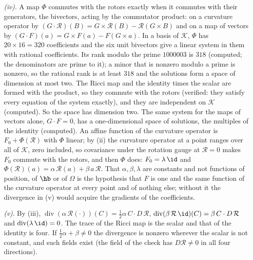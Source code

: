 \emph{(iv).} A map $\Phi$ commutes with the rotors exactly when it commutes with their generators, the bivectors, acting by the commutator product: on a curvature operator by $(G \cdot \mathcal{R})(B) = G \times \mathcal{R}(B) - \mathcal{R}(G \times B)$ and on a map of vectors by $(G \cdot F)(a) = G \times F(a) - F(G \times a)$. In a basis of $\mathcal{K}$, $\Phi$ has $20 \times 16 = 320$ coefficients and the six unit bivectors give a linear system in them with rational coefficients. Its rank modulo the prime $1000003$ is $318$ (computed; the denominators are prime to it); a minor that is nonzero modulo a prime is nonzero, so the rational rank is at least $318$ and the solutions form a space of dimension at most two. The Ricci map and the identity times the scalar are formed with the product, so they commute with the rotors (verified: they satisfy every equation of the system exactly), and they are independent on $\mathcal{K}$ (computed). So the space has dimension two. The same system for the maps of vectors alone, $G \cdot F = 0$, has a one-dimensional space of solutions, the multiples of the identity (computed). An affine function of the curvature operator is $F_{0} + \Phi(\mathcal{R})$ with $\Phi$ linear; by (ii) the curvature operator at a point ranges over all of $\mathcal{K}$, zero included, so covariance under the rotation gauge at $\mathcal{R} = 0$ makes $F_{0}$ commute with the rotors, and then $\Phi$ does: $F_{0} = \lambda\,\id$ and $\Phi(\mathcal{R})(a) = \alpha\,\mathcal{R}(a) + \beta\,a\,\mathcal{R}$. That $\alpha, \beta, \lambda$ are constants and not functions of position, of $\hb$ or of $\Omega$ is the hypothesis that $F$ is one and the same function of the curvature operator at every point and of nothing else; without it the divergence in (v) would acquire the gradients of the coefficients.

\emph{(v).} By (iii), $\operatorname{div}(\alpha\,\mathcal{R}(\cdot))(C) = \tfrac12\alpha\,C \cdot D\,\mathcal{R}$, $\operatorname{div}(\beta\,\mathcal{R}\,\id)(C) = \beta\,C \cdot D\,\mathcal{R}$ and $\operatorname{div}(\lambda\,\id) = 0$. The trace of the Ricci map is the scalar and that of the identity is four. If $\tfrac12\alpha + \beta \neq 0$ the divergence is nonzero wherever the scalar is not constant, and such fields exist (the field of the check has $D\mathcal{R} \neq 0$ in all four directions).

